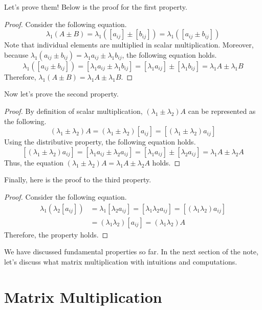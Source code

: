 \documentclass[../main.tex]{subfiles}
\begin{document}
Let's prove them! Below is the proof for the first property.

\begin{proof}
Consider the following equation.
\[
\lambda_1 (A \pm B)
= \lambda_1 ([a_{ij}] \pm [b_{ij}])
= \lambda_1 ([a_{ij} \pm b_{ij}])
\]
Note that individual elements are multiplied in scalar multiplication.
Moreover, because $\lambda_1 (a_{ij} \pm b_{ij}) = \lambda_1 a_{ij}
\pm \lambda_1 b_{ij}$, the following equation holds.
\[
\lambda_1 ([a_{ij} \pm b_{ij}])
= [\lambda_1 a_{ij} \pm \lambda_1 b_{ij}]
= [\lambda_1 a_{ij}] \pm [\lambda_1 b_{ij}]
= \lambda_1 A \pm \lambda_1 B
\]
Therefore, $\lambda_1 (A \pm B) = \lambda_1 A \pm \lambda_1 B$.
\end{proof}

Now let's prove the second property.

\begin{proof}
By definition of scalar multiplication, $(\lambda_1 \pm \lambda_2)
A$ can be represented as the following.
\[
(\lambda_1 \pm \lambda_2) A
= (\lambda_1 \pm \lambda_2) [a_{ij}]
= [(\lambda_1 \pm \lambda_2) a_{ij}]
\]
Using the distributive property, the following equation holds.
\[
[(\lambda_1 \pm \lambda_2) a_{ij}]
= [\lambda_1 a_{ij} \pm \lambda_2 a_{ij}]
= [\lambda_1 a_{ij}] \pm [\lambda_2 a_{ij}]
= \lambda_1 A \pm \lambda_2 A
\]
Thus, the equation $(\lambda_1 \pm \lambda_2) A =
\lambda_1 A \pm \lambda_2 A$ holds.
\end{proof}

Finally, here is the proof to the third property.

\begin{proof}
Consider the following equation.
\begin{align*}
    \lambda_1 (\lambda_2 [a_{ij}])
    &= \lambda_1 [\lambda_2 a_{ij}]
    = [\lambda_1 \lambda_2 a_{ij}]
    = [(\lambda_1 \lambda_2) a_{ij}] \\
    &= (\lambda_1 \lambda_2) [a_{ij}]
    = (\lambda_1 \lambda_2) A
\end{align*}
Therefore, the property holds.
\end{proof}

We have discussed fundamental properties so far. In the next
section of the note, let's discuss what matrix multiplication
with intuitions and computations.

\section{Matrix Multiplication}
\end{document}
